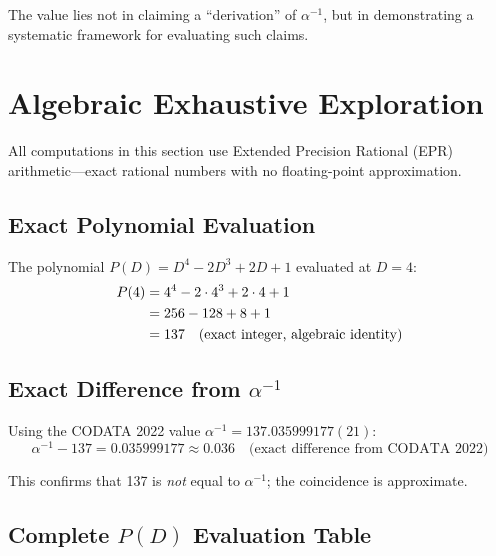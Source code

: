 \documentclass[11pt,a4paper]{article}
\begin{document}
The value lies not in claiming a ``derivation'' of $\alpha^{-1}$, but in demonstrating a systematic framework for evaluating such claims.


\section{Algebraic Exhaustive Exploration}

All computations in this section use Extended Precision Rational (EPR) arithmetic---exact rational numbers with no floating-point approximation.

\subsection{Exact Polynomial Evaluation}

The polynomial $P(D) = D^4 - 2D^3 + 2D + 1$ evaluated at $D = 4$:
\begin{align}
P(4) &= 4^4 - 2 \cdot 4^3 + 2 \cdot 4 + 1 \notag \\
     &= 256 - 128 + 8 + 1 \notag \\
     &= 137 \quad \text{(exact integer, algebraic identity)}
\end{align}

\subsection{Exact Difference from $\alpha^{-1}$}

Using the CODATA 2022 value $\alpha^{-1} = 137.035999177(21)$:
\begin{equation}
\alpha^{-1} - 137 = 0.035999177 \approx 0.036 \quad \text{(exact difference from CODATA 2022)}
\end{equation}

This confirms that 137 is \emph{not} equal to $\alpha^{-1}$; the coincidence is approximate.

\subsection{Complete $P(D)$ Evaluation Table}
\end{document}
